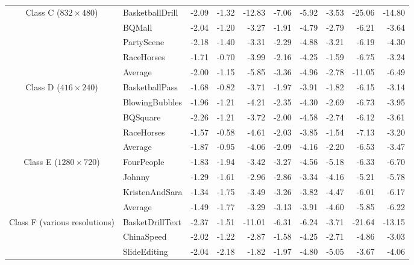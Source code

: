\documentclass[11pt,a4paper,openright,twoside]{book}
\numberwithin{equation}{section} %
\numberwithin{figure}{section} %
\numberwithin{table}{section} %
\begin{document}
\begin{table}[tb]
\begin{tabularx}{\textwidth}{c|X|rr|rr|rr|rr}
		\hline
		\hline
		\multirow{5}{2cm}{\centering Class C \scriptsize($832\times480$)}
		& BasketballDrill        & -2.09 & -1.32 & -12.83 & -7.06 & -5.92 & -3.53 & -25.06 & -14.80 \\
		& BQMall                 & -2.04 & -1.20 &  -3.27 & -1.91 & -4.79 & -2.79 & -6.21  &  -3.64 \\
		& PartyScene             & -2.18 & -1.40 &  -3.31 & -2.29 & -4.88 & -3.21 & -6.19  &  -4.30 \\
		& RaceHorses             & -1.71 & -0.70 &  -3.99 & -2.16 & -4.25 & -1.59 & -6.75  &  -3.24 \\
		\cline{2-10} &
		Average                  & -2.00 & -1.15 &  -5.85 & -3.36 & -4.96 & -2.78 & -11.05 & -6.49 \\
		\hline
		\hline
		\multirow{5}{2cm}{\centering Class D \scriptsize($416\times240$)}
		& BasketballPass         & -1.68 & -0.82 &  -3.71 & -1.97 & -3.91 & -1.82 & -6.15  &  -3.14 \\
		& BlowingBubbles         & -1.96 & -1.21 &  -4.21 & -2.35 & -4.30 & -2.69 & -6.73  &  -3.95 \\
		& BQSquare               & -2.26 & -1.21 &  -3.72 & -2.00 & -4.58 & -2.74 & -6.12  &  -3.61 \\
		& RaceHorses             & -1.57 & -0.58 &  -4.61 & -2.03 & -3.85 & -1.54 & -7.13  &  -3.20 \\
		\cline{2-10} &
		Average                  & -1.87 & -0.95 &  -4.06 & -2.09 & -4.16 & -2.20 & -6.53  & -3.47 \\
		\hline
		\hline
		\multirow{4}{2cm}{\centering Class E \scriptsize($1280\times720$)}
		& FourPeople             & -1.83 & -1.94 &  -3.42 & -3.27 & -4.56 & -5.18 & -6.33  &  -6.70 \\
		& Johnny                 & -1.29 & -1.61 &  -2.96 & -2.86 & -3.34 & -4.16 & -5.21  &  -5.78 \\
		& KristenAndSara         & -1.34 & -1.75 &  -3.49 & -3.26 & -3.82 & -4.47 & -6.01  &  -6.17 \\
		\cline{2-10} &
		Average                  & -1.49 & -1.77 &  -3.29 & -3.13 & -3.91 & -4.60 & -5.85  & -6.22 \\
		\hline
		\hline
		\multirow{5}{2cm}{\centering Class F \scriptsize(various resolutions)}
		& BasketDrillText        & -2.37 & -1.51 & -11.01 & -6.31 & -6.24 & -3.71 & -21.64 & -13.15 \\
		& ChinaSpeed             & -2.02 & -1.22 &  -2.87 & -1.58 & -4.25 & -2.71 & -4.86  &  -3.03 \\
		& SlideEditing           & -2.04 & -2.18 &  -1.82 & -1.97 & -4.80 & -5.05 & -3.67  &  -4.06 \\

\end{tabularx}
\end{table}
\end{document}

